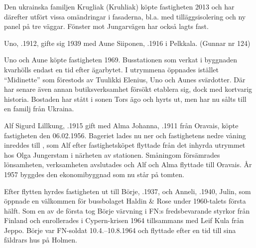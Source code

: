

Den ukrainska familjen Krugliak (Kruhliak) köpte fastigheten 2013 och har därefter utfört vissa omändringar i fasaderna, bl.a. med tilläggsisolering och ny panel på tre väggar. Fönster mot Jungarvägen har också lagts fast.



Uno, .1912, gifte sig 1939 med Aune Siiponen, .1916 i Pelkkala. (Gunnar nr 124)
\begin{jhchildren}
  \item {}
  \item {}
  \item {}
  \item {}
\end{jhchildren}
Uno och Aune köpte fastigheten 1969. Busstationen som verkat i byggnaden kvarhölls endast en tid efter ägarbytet. I utrymmena öppnades istället  ``Midinette'' som förestods av Tuulikki Elenius, Uno och Aunes svärdotter. Där har senare även annan butiksverksamhet försökt etablera sig, dock med kortvarig historia. Bostaden har stått i sonen Tors ägo och hyrts ut, men har nu sålts till en familj från Ukraina.


Alf Sigurd Lillkung, .1915 gift med Alma Johanna, .1911 från Oravais, köpte fastigheten den 06.02.1956. Bageriet lades nu ner och fastighetens nedre våning inreddes till , som Alf efter fastighetsköpet flyttade från det inhyrda utrymmet hos Olga Jungerstam i närheten av stationen. Småningom försämrades lönsamheten, verksamheten avslutades och Alf och Alma flyttade till Oravais. År 1957 byggdes den ekonomibyggnad som nu står på tomten.

Efter flytten hyrdes fastigheten ut till Börje, .1937, och Anneli, .1940, Julin, som öppnade en välkommen  för bussbolaget Haldin \& Rose under 1960-talets första hälft. Som en av de första tog Börje värvning i FN:s fredsbevarande styrkor från Finland och enrollerades i Cypern-krisen 1964 tillsammans med Leif Kula från Jeppo. Börje var FN-soldat 10.4.--10.8.1964 och flyttade efter en tid till sina fäldrars hus på Holmen.

